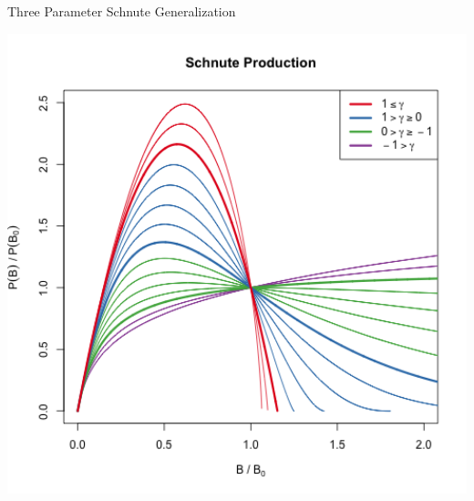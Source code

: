 \documentclass[ xcolor = pdftex, dvipsnames, table ]{beamer}
\begin{document}
\begin{frame}{Three Parameter Schnute Generalization}
\begin{minipage}[h!]{0.52\textwidth}
        \includegraphics[width=1.1\textwidth]{../../gpBias/g3.png} %
\end{minipage}

\end{frame}
\end{document}
